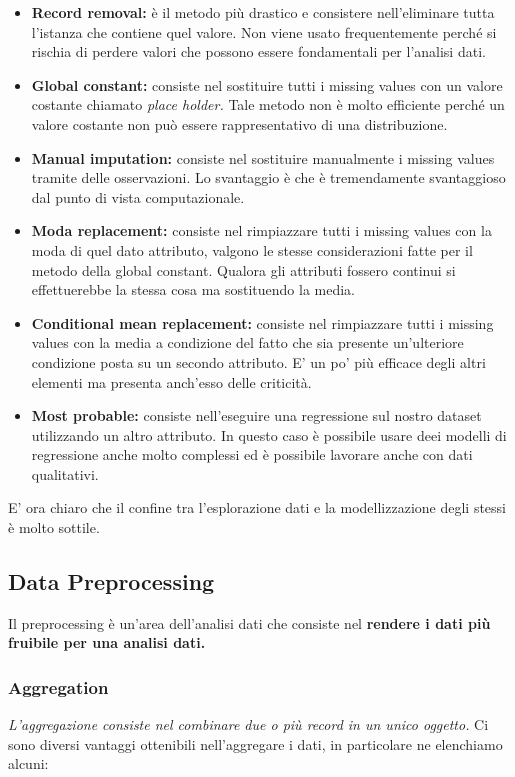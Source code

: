 \begin{itemize}
	\item \textbf{Record removal:} è il metodo più drastico e consistere nell'eliminare tutta l'istanza che contiene quel valore. Non viene usato frequentemente perché si rischia di perdere valori che possono essere fondamentali per l'analisi dati.
	
	\item \textbf{Global constant:} consiste nel sostituire tutti i missing values con un valore costante chiamato \textit{place holder.} Tale metodo non è molto efficiente perché un valore costante non può essere rappresentativo di una distribuzione.
	
	\item \textbf{Manual imputation:} consiste nel sostituire manualmente i missing values tramite delle osservazioni. Lo svantaggio è che è tremendamente svantaggioso dal punto di vista computazionale.
	\item  \textbf{Moda replacement:} consiste nel rimpiazzare tutti i missing values con la moda di quel dato attributo, valgono le stesse considerazioni fatte per il metodo della global constant. Qualora gli attributi fossero continui si effettuerebbe la stessa cosa ma sostituendo la media.
	\item \textbf{Conditional mean replacement:} consiste nel rimpiazzare tutti i missing values con la media a condizione del fatto che sia presente un'ulteriore condizione posta su un secondo attributo. E' un po' più efficace degli altri elementi ma presenta anch'esso delle criticità.
	
	\item \textbf{Most probable:} consiste nell'eseguire una regressione sul nostro dataset utilizzando un altro attributo. In questo caso è possibile usare deei modelli di regressione anche molto complessi ed è possibile lavorare anche con dati qualitativi.
\end{itemize}

E' ora chiaro che il confine tra l'esplorazione dati e la modellizzazione degli stessi è molto sottile.

\subsection{Data Preprocessing}

Il preprocessing è un'area dell'analisi dati che consiste nel \textbf{rendere i dati più fruibile per una analisi dati.}

\subsubsection{Aggregation}
\textit{L'aggregazione consiste nel combinare due o più record in un unico oggetto.}
Ci sono diversi vantaggi ottenibili nell'aggregare i dati, in particolare ne elenchiamo alcuni:

